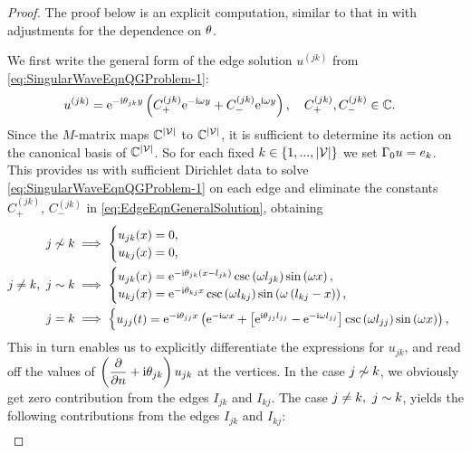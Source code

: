 \begin{proof}
	The proof below is an explicit computation, similar to that in \cite{ershova2014isospectrality} with adjustments for the dependence on $\theta$.
	
	We first write the general form of the edge solution $u^{(jk)}$ from \eqref{eq:SingularWaveEqnQGProblem-1}:
	\begin{align} \label{eq:EdgeEqnGeneralSolution}
		u^{(jk)} &= \mathrm{e}^{-\mathrm{i}\theta_{jk}y}\left(  C_{+}^{(jk)}\mathrm{e}^{-\mathrm{i}\omega y} + C_{-}^{(jk)}\mathrm{e}^{\mathrm{i}\omega y}  \right),
		\quad C_{+}^{(jk)}, C_{-}^{(jk)}\in\mathbb{C}.
	\end{align}
	Since the $M$-matrix maps $\mathbb{C}^{\left\lvert \mathcal{V} \right\rvert}$ to $\mathbb{C}^{\left\lvert \mathcal{V} \right\rvert}$, it is sufficient to determine its action on the canonical basis of $\mathbb{C}^{\left\lvert \mathcal{V} \right\rvert}$.
	So for each fixed $k\in\left\{ 1,...,\left\lvert \mathcal{V} \right\rvert \right\}$ we set $\Gamma_0 u = e_k$.
	This provides us with sufficient Dirichlet data to solve \eqref{eq:SingularWaveEqnQGProblem-1} on each edge and eliminate the constants $C_{+}^{(jk)}$, $C_{-}^{(jk)}$ in \eqref{eq:EdgeEqnGeneralSolution}, obtaining
	\begin{align*}
		j\not\sim k &\implies
		\begin{cases}
			u_{jk}(x) = 0, \\
			u_{kj}(x) = 0,
		\end{cases} \\
		j\neq k, \ j\sim k &\implies
		\begin{cases}
			u_{jk}(x) = \mathrm{e}^{-\mathrm{i}\theta_{jk}\left( x-l_{jk} \right)}\csc\left( \omega l_{jk} \right)\sin\left( \omega x \right), \\
			u_{kj}(x) = \mathrm{e}^{-\mathrm{i}\theta_{kj}x}\csc\left( \omega l_{kj} \right)\sin\left( \omega \left( l_{kj}-x \right) \right),
		\end{cases} \\
		j = k &\implies 
		\begin{cases}
			u_{jj}(t) = \mathrm{e}^{-\mathrm{i}\theta_{jj}x} \left(  \mathrm{e}^{-\mathrm{i}\omega x} + \left[ \mathrm{e}^{\mathrm{i}\theta_{jj}l_{jj}}-\mathrm{e}^{-\mathrm{i}\omega l_{jj}} \right]\csc\left( \omega l_{jj} \right)\sin\left( \omega x \right)   \right),
		\end{cases}
	\end{align*}
	This in turn enables us to explicitly differentiate the expressions for $u_{jk}$, and read off the values of $\left( \dfrac{\partial }{\partial n}+\mathrm{i}\theta_{jk} \right)u_{jk}$ at the vertices.
	In the case $j\not\sim k$, we obviously get zero contribution from the edges $I_{jk}$ and $I_{kj}$.
	The case $j\neq k, \ j\sim k$, yields the following contributions from the edges $I_{jk}$ and $I_{kj}$:
	\begin{align*}

\end{align*}
\end{proof}
